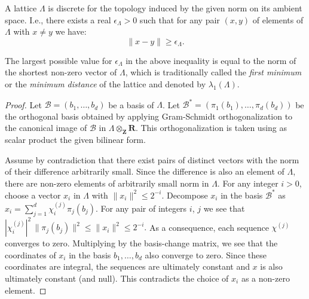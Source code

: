 \documentclass[10pt,a4paper]{amsart}
\newcommand{\Bas}{\mathcal{B}}
\newcommand{\Lat}{\Lambda}
\newcommand{\RR}{\mathbf{R}}
\newcommand{\ZZ}{\mathbf{Z}}
\begin{document}
\begin{lemma}
A lattice $\Lat$ is discrete for the topology induced by the given
norm on its ambient space. I.e., there exists a real $\epsilon_\Lat>0$ such
that for any pair $(x,y)$ of elements of $\Lat$ with $x\neq y$ we
have:
$$
\| x-y \| \geq \epsilon_\Lat.
$$

The largest possible value for $\epsilon_\Lat$ in the above inequality
is equal to the norm of the shortest non-zero vector of $\Lat$, which
is traditionally called the \emph{first minimum} or the \emph{minimum
  distance} of the lattice and denoted by $\lambda_1 (\Lat)$.
\end{lemma}

\begin{proof}
  Let $\Bas = (b_1, \ldots, b_d)$ be a basis of $\Lat$. Let
  $\Bas^* = (\pi_1(b_1), \ldots, \pi_d(b_d))$ be the orthogonal basis obtained by
  applying Gram-Schmidt orthogonalization to the canonical image of
  $\Bas$ in $\Lat\otimes_\ZZ \RR$. This orthogonalization is taken using
  as scalar product the given bilinear form.

Assume by contradiction that there exist pairs of distinct vectors
with the norm of their difference arbitrarily small.  Since the
difference is also an element of $\Lat$, there are non-zero elements
of arbitrarily small norm in $\Lat$.
For any integer $i>0$, choose a
vector $x_i$ in $\Lat$ with $\|x_i\|^2\leq 2^{-i}.$ Decompose
$x_i$ in the basis $\Bas^*$ as
$
x_i=\sum_{j=1}^{d}\chi_i^{(j)}\pi_j(b_j).
$
For any pair of integers $i$, $j$ we see that
$
|\chi_i^{(j)}|^2\,\|\pi_j(b_j)\|^2\leq \|x_i\|^2\leq 2^{-i}.
$
As a consequence, each sequence $\chi^{(j)}$ converges to
zero. Multiplying by the basis-change matrix, we see that the coordinates
of $x_i$ in the basis $b_1, \ldots, b_d$ also converge to zero. Since these
coordinates are integral, the sequences are ultimately constant and
$x$ is also ultimately constant (and null). This contradicts the choice of
$x_i$ as a non-zero element.
\end{proof}
\end{document}

